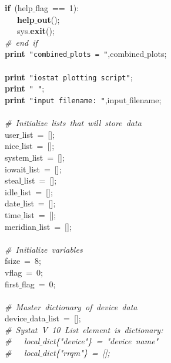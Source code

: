 \mbox{}\ \ \ \textbf{if}\ (help$\_$flag\ ==\ 1): \\
\mbox{}\ \ \ \ \ \ \textbf{help$\_$out}(); \\
\mbox{}\ \ \ \ \ \ sys.\textbf{exit}(); \\
\mbox{}\ \ \ \textit{\#\ end\ if} \\
\mbox{}\ \ \ \textbf{print}\ \texttt{"{}combined$\_$plots\ =\ "{}},combined$\_$plots; \\
\mbox{}\ \ \  \\
\mbox{}\ \ \ \textbf{print}\ \texttt{"{}iostat\ plotting\ script"{}}; \\
\mbox{}\ \ \ \textbf{print}\ \texttt{"{}\ "{}}; \\
\mbox{}\ \ \ \textbf{print}\ \texttt{"{}input\ filename:\ "{}},input$\_$filename; \\
\mbox{}\ \ \  \\
\mbox{}\ \ \ \textit{\#\ Initialize\ lists\ that\ will\ store\ data} \\
\mbox{}\ \ \ user$\_$list\ =\ []; \\
\mbox{}\ \ \ nice$\_$list\ =\ []; \\
\mbox{}\ \ \ system$\_$list\ =\ []; \\
\mbox{}\ \ \ iowait$\_$list\ =\ []; \\
\mbox{}\ \ \ steal$\_$list\ =\ []; \\
\mbox{}\ \ \ idle$\_$list\ =\ []; \\
\mbox{}\ \ \ date$\_$list\ =\ []; \\
\mbox{}\ \ \ time$\_$list\ =\ []; \\
\mbox{}\ \ \ meridian$\_$list\ =\ []; \\
\mbox{}\ \ \  \\
\mbox{}\ \ \ \textit{\#\ Initialize\ variables} \\
\mbox{}\ \ \ fsize\ =\ 8; \\
\mbox{}\ \ \ vflag\ =\ 0; \\
\mbox{}\ \ \ first$\_$flag\ =\ 0; \\
\mbox{}\ \ \  \\
\mbox{}\ \ \ \textit{\#\ Master\ dictionary\ of\ device\ data} \\
\mbox{}\ \ \ device$\_$data$\_$list\ =\ []; \\
\mbox{}\ \ \ \textit{\#\ Systat\ V\ 10\ List\ element\ is\ dictionary:} \\
\mbox{}\ \ \ \textit{\#\ \ \ local$\_$dict\{"{}device"{}\}\ =\ "{}device\ name"{}} \\
\mbox{}\ \ \ \textit{\#\ \ \ local$\_$dict\{"{}rrqm"{}\}\ =\ [];} \\
